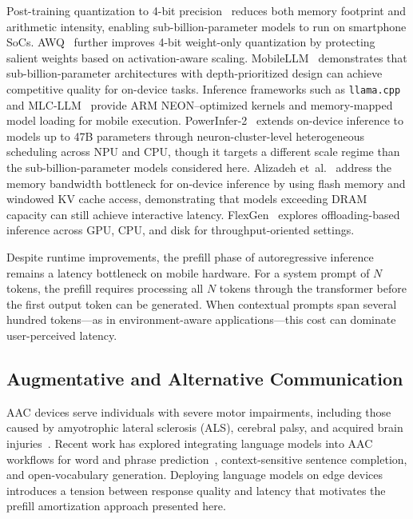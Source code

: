 \documentclass[journal]{IEEEtran}
\begin{document}
Post-training quantization to 4-bit precision~\cite{dettmers2022,frantar2022} reduces both memory footprint and arithmetic intensity, enabling sub-billion-parameter models to run on smartphone SoCs. AWQ~\cite{awq} further improves 4-bit weight-only quantization by protecting salient weights based on activation-aware scaling. MobileLLM~\cite{mobilellm} demonstrates that sub-billion-parameter architectures with depth-prioritized design can achieve competitive quality for on-device tasks. Inference frameworks such as \texttt{llama.cpp}~\cite{llamacpp} and MLC-LLM~\cite{mlcllm} provide ARM NEON--optimized kernels and memory-mapped model loading for mobile execution. PowerInfer-2~\cite{powerinfer2} extends on-device inference to models up to 47B parameters through neuron-cluster-level heterogeneous scheduling across NPU and CPU, though it targets a different scale regime than the sub-billion-parameter models considered here. Alizadeh et~al.~\cite{llminaflash} address the memory bandwidth bottleneck for on-device inference by using flash memory and windowed KV cache access, demonstrating that models exceeding DRAM capacity can still achieve interactive latency. FlexGen~\cite{flexgen} explores offloading-based inference across GPU, CPU, and disk for throughput-oriented settings.

Despite runtime improvements, the prefill phase of autoregressive inference remains a latency bottleneck on mobile hardware. For a system prompt of $N$ tokens, the prefill requires processing all $N$ tokens through the transformer before the first output token can be generated. When contextual prompts span several hundred tokens---as in environment-aware applications---this cost can dominate user-perceived latency.

\subsection{Augmentative and Alternative Communication}
\label{sec:related_aac}

AAC devices serve individuals with severe motor impairments, including those caused by amyotrophic lateral sclerosis (ALS), cerebral palsy, and acquired brain injuries~\cite{beukelman2020}. Recent work has explored integrating language models into AAC workflows for word and phrase prediction~\cite{vertanen2015}, context-sensitive sentence completion, and open-vocabulary generation. Deploying language models on edge devices introduces a tension between response quality and latency that motivates the prefill amortization approach presented here.
\end{document}
